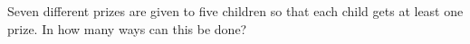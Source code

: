 Seven different prizes are given to five children so that each child gets at least one prize. In how many ways can this be done?
